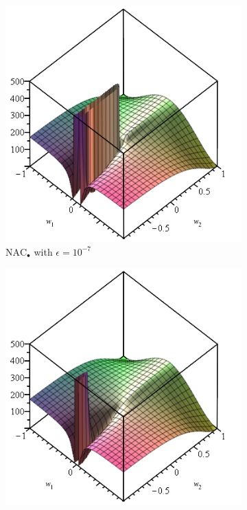 \begin{figure}[h]
\centering
\begin{subfigure}{.33\textwidth}
  \centering
  \includegraphics[width=\linewidth,trim={0 0 0 4.35cm},clip]{graphics/nac-mul-eps-1em7.png}
  \caption{$\mathrm{NAC}_{\bullet}$ with $\epsilon = 10^{-7}$}
\end{subfigure}%
\begin{subfigure}{.33\textwidth}
  \centering
  \includegraphics[width=\linewidth,trim={0 0 0 4.35cm},clip]{graphics/nac-mul-eps-1em1.png}

\end{subfigure}
\end{figure}
